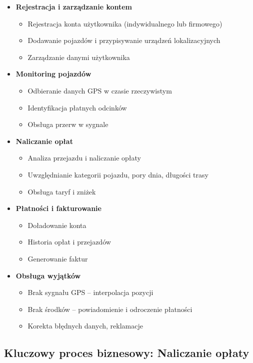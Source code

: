 \documentclass[a4paper,12pt]{article}
\theoremstyle{definition}
\begin{document}
\begin{itemize}
  \item \textbf{Rejestracja i zarządzanie kontem}
  \begin{itemize}
    \item Rejestracja konta użytkownika (indywidualnego lub firmowego)
    \item Dodawanie pojazdów i przypisywanie urządzeń lokalizacyjnych
    \item Zarządzanie danymi użytkownika
  \end{itemize}

  \item \textbf{Monitoring pojazdów}
  \begin{itemize}
    \item Odbieranie danych GPS w czasie rzeczywistym
    \item Identyfikacja płatnych odcinków
    \item Obsługa przerw w sygnale
  \end{itemize}

  \item \textbf{Naliczanie opłat}
  \begin{itemize}
    \item Analiza przejazdu i naliczanie opłaty
    \item Uwzględnianie kategorii pojazdu, pory dnia, długości trasy
    \item Obsługa taryf i zniżek
  \end{itemize}

  \item \textbf{Płatności i fakturowanie}
  \begin{itemize}
    \item Doładowanie konta
    \item Historia opłat i przejazdów
    \item Generowanie faktur
  \end{itemize}

  \item \textbf{Obsługa wyjątków}
  \begin{itemize}
    \item Brak sygnału GPS – interpolacja pozycji
    \item Brak środków – powiadomienie i odroczenie płatności
    \item Korekta błędnych danych, reklamacje
  \end{itemize}
\end{itemize}

\subsection{Kluczowy proces biznesowy: Naliczanie opłaty}
\end{document}

